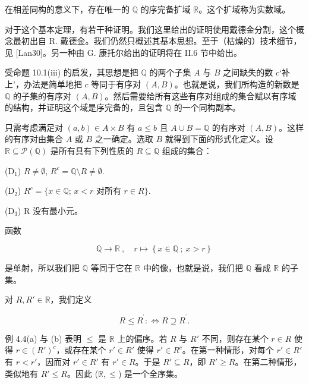 \begin{theorem}

在相差同构的意义下，存在唯一的 $ \mathbb{Q} $ 的序完备扩域 $ \mathbb{R} $。这个扩域称为实数域。

\proofhead
对于这个基本定理，有若干种证明。我们这里给出的证明使用戴德金分割，这个概念最初出自 R. 戴德金。我们仍然只概述其基本思想。至于（枯燥的）技术细节，见 [Lan30]。另一种由 G. 康托尔给出的证明将在 II.6 节中给出。

受命题 10.1(iii) 的启发，其思想是把 $ \mathbb{Q} $ 的两个子集 $ A $ 与 $ B $ 之间缺失的数 $ c $‘补上’，办法是简单地把 $ c $ 等同于有序对 $ (A,B) $。也就是说，我们所构造的新数是 $ \mathbb{Q} $ 的子集的有序对 $ (A,B) $。然后需要给所有这些有序对组成的集合赋以有序域的结构，并证明这个域是序完备的，且包含 $ \mathbb{Q} $ 的一个同构副本。

只需考虑满足对 $ (a,b) \in A \times B $ 有 $ a \leq b $ 且 $ A \cup B = \mathbb{Q} $ 的有序对 $ (A,B) $。这样的有序对由集合 $ A $ 或 $ B $ 之一确定。选取 $ B $ 就得到下面的形式化定义。设 $ \mathbb{R} \subseteq \mathcal{P}(\mathbb{Q}) $ 是所有具有下列性质的 $ R \subseteq \mathbb{Q} $ 组成的集合：

\begin{items}
\item[（d）]

(D$_1$)  $ R \neq \emptyset $,  $ R^c = \mathbb{Q} \setminus R \neq \emptyset $.

\end{items}

(D$_2$)  $ R^c = \{ x \in \mathbb{Q} ; \, x < r \text{ 对所有 } r \in R \} $.

(D$_3$) R 没有最小元。

函数

\begin{equation}
\mathbb{Q}\to\mathbb{R}~,\quad r\mapsto\left\{x\in\mathbb{Q}~;~x>r\right\}
\end{equation}

是单射，所以我们把 $ \mathbb{Q} $ 等同于它在 $ \mathbb{R} $ 中的像，也就是说，我们把 $ \mathbb{Q} $ 看成 $ \mathbb{R} $ 的子集。

对 $ R, R' \in \mathbb{R} $，我们定义

\begin{equation}
R\leq R^{^{\prime}}:\Longleftrightarrow R\supseteq R^{^{\prime}}.
\end{equation}

例 4.4(a) 与 (b) 表明 $ \leq $ 是 $ \mathbb{R} $ 上的偏序。若 $ R $ 与 $ R' $ 不同，则存在某个 $ r \in R $ 使得 $ r \in (R')^c $，或存在某个 $ r' \in R' $ 使得 $ r' \in R^c $。在第一种情形，对每个 $ r' \in R' $ 有 $ r < r' $，因而对 $ r' \in R' $ 有 $ r' \in R $。于是 $ R' \subseteq R $，即 $ R' \geq R $。在第二种情形，类似地有 $ R' \leq R $。因此 ($ \mathbb{R}, \leq $) 是一个全序集。


\end{theorem}

